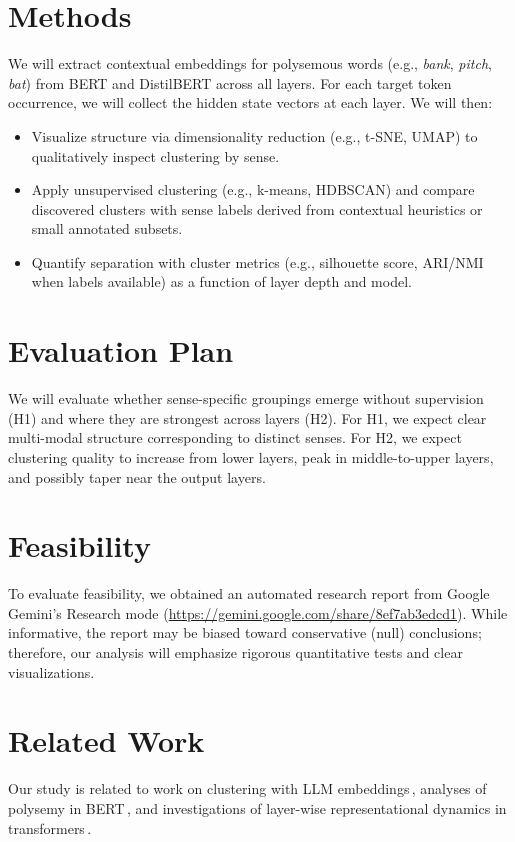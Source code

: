 \documentclass{template}
\begin{document}
\newpage


\section*{Methods}
We will extract contextual embeddings for polysemous words (e.g., \textit{bank}, \textit{pitch}, \textit{bat}) from BERT and DistilBERT across all layers. For each target token occurrence, we will collect the hidden state vectors at each layer. We will then:
\begin{itemize}
    \item Visualize structure via dimensionality reduction (e.g., t\textsc{-}SNE, UMAP) to qualitatively inspect clustering by sense.
    \item Apply unsupervised clustering (e.g., k-means, HDBSCAN) and compare discovered clusters with sense labels derived from contextual heuristics or small annotated subsets.
    \item Quantify separation with cluster metrics (e.g., silhouette score, ARI/NMI when labels available) as a function of layer depth and model.
\end{itemize}


\section*{Evaluation Plan}
We will evaluate whether sense-specific groupings emerge without supervision (H1) and where they are strongest across layers (H2). For H1, we expect clear multi-modal structure corresponding to distinct senses. For H2, we expect clustering quality to increase from lower layers, peak in middle-to-upper layers, and possibly taper near the output layers.


\section*{Feasibility}
To evaluate feasibility, we obtained an automated research report from Google Gemini's Research mode (\url{https://gemini.google.com/share/8ef7ab3edcd1}). While informative, the report may be biased toward conservative (null) conclusions; therefore, our analysis will emphasize rigorous quantitative tests and clear visualizations.

\newpage


\section*{Related Work}
Our study is related to work on clustering with LLM embeddings\,\cite{petukhova2025}, analyses of polysemy in BERT\,\cite{yenicelik2020}, and investigations of layer-wise representational dynamics in transformers\,\cite{nadipalli2025}.

\makecitations%
\vfill
\pagebreak
\end{document}
